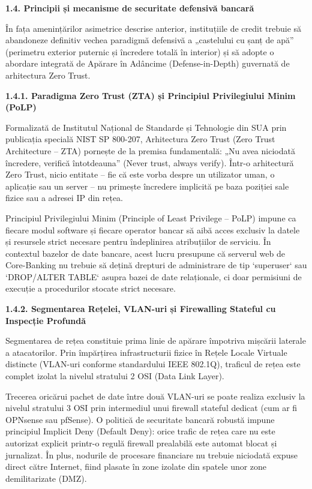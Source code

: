 \documentclass[
]{article}
\begin{document}
\textbf{1.4. Principii și mecanisme de securitate defensivă bancară}

În fața amenințărilor asimetrice descrise anterior, instituțiile de
credit trebuie să abandoneze definitiv vechea paradigmă defensivă a
„castelului cu șanț de apă'' (perimetru exterior puternic și încredere
totală în interior) și să adopte o abordare integrată de Apărare în
Adâncime (Defense-in-Depth) guvernată de arhitectura Zero Trust.

\textbf{1.4.1. Paradigma Zero Trust (ZTA) și Principiul Privilegiului
Minim (PoLP)}

Formalizată de Institutul Național de Standarde și Tehnologie din SUA
prin publicația specială NIST SP 800-207, Arhitectura Zero Trust (Zero
Trust Architecture -- ZTA) pornește de la premisa fundamentală: „Nu avea
niciodată încredere, verifică întotdeauna'' (Never trust, always
verify). Într-o arhitectură Zero Trust, nicio entitate -- fie că este
vorba despre un utilizator uman, o aplicație sau un server -- nu
primește încredere implicită pe baza poziției sale fizice sau a adresei
IP din rețea.

Principiul Privilegiului Minim (Principle of Least Privilege -- PoLP)
impune ca fiecare modul software și fiecare operator bancar să aibă
acces exclusiv la datele și resursele strict necesare pentru
îndeplinirea atribuțiilor de serviciu. În contextul bazelor de date
bancare, acest lucru presupune că serverul web de Core-Banking nu
trebuie să dețină drepturi de administrare de tip `superuser` sau
`DROP/ALTER TABLE` asupra bazei de date relaționale, ci doar permisiuni
de execuție a procedurilor stocate strict necesare.

\textbf{1.4.2. Segmentarea Rețelei, VLAN-uri și Firewalling Stateful cu
Inspecție Profundă}

Segmentarea de rețea constituie prima linie de apărare împotriva
mișcării laterale a atacatorilor. Prin împărțirea infrastructurii fizice
în Rețele Locale Virtuale distincte (VLAN-uri conforme standardului IEEE
802.1Q), traficul de rețea este complet izolat la nivelul stratului 2
OSI (Data Link Layer).

Trecerea oricărui pachet de date între două VLAN-uri se poate realiza
exclusiv la nivelul stratului 3 OSI prin intermediul unui firewall
stateful dedicat (cum ar fi OPNsense sau pfSense). O politică de
securitate bancară robustă impune principiul Implicit Deny (Default
Deny): orice trafic de rețea care nu este autorizat explicit printr-o
regulă firewall prealabilă este automat blocat și jurnalizat. În plus,
nodurile de procesare financiare nu trebuie niciodată expuse direct
către Internet, fiind plasate în zone izolate din spatele unor zone
demilitarizate (DMZ).
\end{document}

